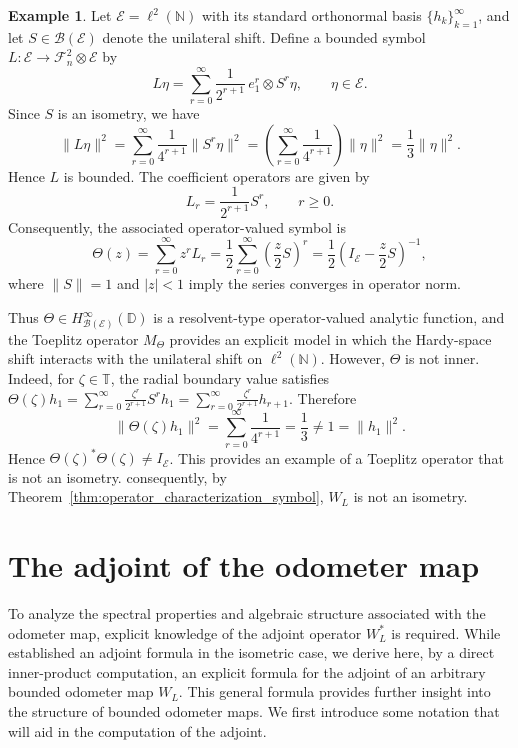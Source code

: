 \documentclass[12pt]{amsart}
\theoremstyle{definition}
\newtheorem{example}[theorem]{Example}
\theoremstyle{remark}
\def \D{\mathbb{D}}
\def \N{\mathbb{N}}
\def \T{\mathbb{T}}
\newcommand{\clb}{\mathcal{B}}
\newcommand{\cle}{\mathcal{E}}
\newcommand{\clf}{\mathcal{F}}
\numberwithin{equation}{section}
\begin{document}
\begin{example}
Let $\cle=\ell^2(\N)$ with its standard orthonormal basis
$\{h_k\}_{k=1}^\infty$, and let
$S\in\clb(\cle)$ denote the unilateral shift.
Define a bounded symbol $L:\cle\to \clf_n^2\otimes \cle$
by
\[
L\eta=\sum_{r=0}^\infty \frac{1}{2^{r+1}}\, e_1^{r}\otimes S^r\eta,
\qquad \eta\in\cle.
\]
Since $S$ is an isometry, we have
\[
\|L\eta\|^2
=
\sum_{r=0}^\infty \frac{1}{4^{r+1}}
\|S^r\eta\|^2
=
\left(\sum_{r=0}^\infty \frac{1}{4^{r+1}}\right)\|\eta\|^2
=
\frac13\|\eta\|^2.
\]
Hence $L$ is bounded.
The coefficient operators are given by
\[
L_r=\frac{1}{2^{r+1}}S^r,\qquad r\ge0.
\]
Consequently, the associated operator-valued symbol is
\[
\Theta(z)
=
\sum_{r=0}^\infty z^rL_r
=
\frac12\sum_{r=0}^\infty
\left(\frac z2 S\right)^r =
\frac12\left(I_{\cle}-\frac z2 S\right)^{-1},
\]
where $\|S\|=1$ and $|z|<1$ imply the series converges in operator norm.

Thus $\Theta\in H^\infty_{\clb(\cle)}(\D)$ is a
resolvent-type operator-valued analytic function, and the Toeplitz operator
$M_{\Theta}$ provides an explicit model in which the Hardy-space shift
interacts with the unilateral shift on $\ell^2(\N)$.
However, \(\Theta\) is not inner. Indeed, for \(\zeta\in\T\), the radial
boundary value satisfies $\Theta(\zeta)h_1
=
\sum_{r=0}^{\infty}
\frac{\zeta^r}{2^{r+1}}S^r h_1
=
\sum_{r=0}^{\infty}
\frac{\zeta^r}{2^{r+1}}h_{r+1}.$
Therefore
\[
\|\Theta(\zeta)h_1\|^2
=
\sum_{r=0}^{\infty}\frac{1}{4^{r+1}}
=
\frac13
\neq 1
=
\|h_1\|^2.
\]
Hence \(\Theta(\zeta)^*\Theta(\zeta)\neq I_{\cle}\). 
This provides an example of a Toeplitz operator that is not an isometry. consequently, by
Theorem~\ref{thm:operator_characterization_symbol}, \(W_L\) is not an isometry.
\end{example} 




\section{The adjoint of the odometer map} \label{sec:The adjoint of odometer map}
To analyze the spectral properties and algebraic structure associated with the odometer map, explicit knowledge of the adjoint operator $W_L^*$ is required. While \cite[Proposition~4.1]{mansi2025} established an adjoint formula in the
isometric case, we derive here, by a direct inner-product computation, an
explicit formula for the adjoint of an arbitrary bounded odometer map \(W_L\). 
This general formula provides further insight into the structure of bounded
odometer maps. We first introduce some notation that will aid in the computation of the adjoint.
\end{document}
